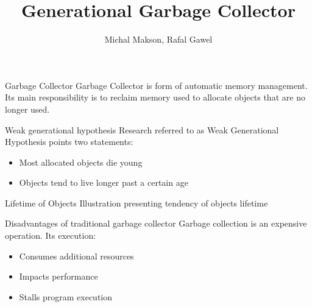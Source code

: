 \documentclass[presentation]{beamer}
\title{Generational Garbage Collector}
\author{Michal Makson, Rafal Gawel}
\institute{AGH University of Science and Technology}
\date{}
\begin{document}
\begin{frame}
  \titlepage
\end{frame}

\begin{frame}{Garbage Collector}
Garbage Collector is form of automatic memory management.\\
Its main responsibility is to reclaim memory used to allocate objects that are no longer used.
\end{frame}

\begin{frame}{Weak generational hypothesis}
	Research referred to as Weak Generational Hypothesis
	points two statements:
	\newline
	\begin{itemize}
		\item Most allocated objects die young
		\item Objects tend to live longer past a certain age
	\end{itemize}
\end{frame}

\begin{frame}{Lifetime of Objects}
Illustration presenting tendency of objects lifetime
\newline


\end{frame}

\begin{frame}{Disadvantages of traditional garbage collector}
	Garbage collection is an expensive operation.
	Its execution:
	\newline
	\begin{itemize}
		\item Consumes additional resources
		\item Impacts performance
		\item Stalls program execution
	\end{itemize}
	
\end{frame}
\end{document}
